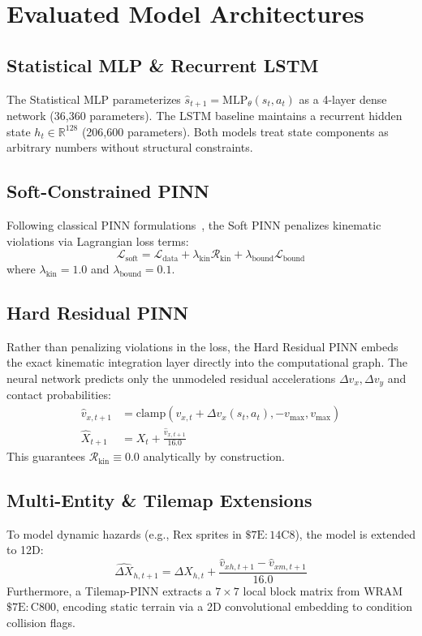 \documentclass[10pt,twocolumn,letterpaper]{article}
\begin{document}
\section{Evaluated Model Architectures}

\subsection{Statistical MLP \& Recurrent LSTM}
The Statistical MLP parameterizes $\hat{s}_{t+1} = \text{MLP}_\theta(s_t, a_t)$ as a 4-layer dense network (36,360 parameters). The LSTM baseline maintains a recurrent hidden state $h_t \in \mathbb{R}^{128}$ (206,600 parameters). Both models treat state components as arbitrary numbers without structural constraints.

\subsection{Soft-Constrained PINN}
Following classical PINN formulations~\cite{raissi2019physics}, the Soft PINN penalizes kinematic violations via Lagrangian loss terms:
\begin{equation}
    \mathcal{L}_{\text{soft}} = \mathcal{L}_{\text{data}} + \lambda_{\text{kin}} \mathcal{R}_{\text{kin}} + \lambda_{\text{bound}} \mathcal{L}_{\text{bound}}
\end{equation}
where $\lambda_{\text{kin}} = 1.0$ and $\lambda_{\text{bound}} = 0.1$.

\subsection{Hard Residual PINN}
Rather than penalizing violations in the loss, the Hard Residual PINN embeds the exact kinematic integration layer directly into the computational graph. The neural network predicts only the unmodeled residual accelerations $\Delta v_x, \Delta v_y$ and contact probabilities:
\begin{align}
    \hat{v}_{x, t+1} &= \text{clamp}(v_{x, t} + \Delta v_x(s_t, a_t), -v_{\max}, v_{\max}) \\
    \hat{X}_{t+1} &= X_t + \frac{\hat{v}_{x, t+1}}{16.0}
\end{align}
This guarantees $\mathcal{R}_{\text{kin}} \equiv 0.0$ analytically by construction.

\subsection{Multi-Entity \& Tilemap Extensions}
To model dynamic hazards (e.g., Rex sprites in $\$7\text{E}:14\text{C}8$), the model is extended to 12D:
\begin{equation}
    \hat{\Delta X}_{h, t+1} = \Delta X_{h, t} + \frac{\hat{v}_{xh, t+1} - \hat{v}_{xm, t+1}}{16.0}
\end{equation}
Furthermore, a Tilemap-PINN extracts a $7 \times 7$ local block matrix from WRAM $\$7\text{E}:\text{C}800$, encoding static terrain via a 2D convolutional embedding to condition collision flags.
\end{document}
